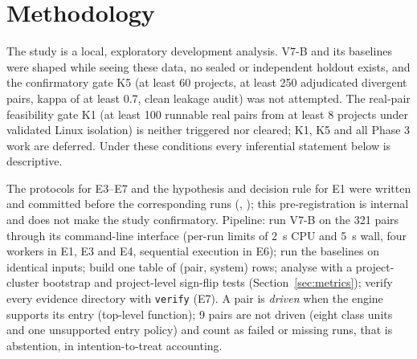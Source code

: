 \section{Methodology}\label{sec:method}
The study is a local, exploratory development analysis. V7-B and its baselines were shaped while seeing these data, no sealed or independent holdout exists, and the confirmatory gate K5 (at least 60 projects, at least 250 adjudicated divergent pairs, kappa of at least 0.7, clean leakage audit) was not attempted. The real-pair feasibility gate K1 (at least 100 runnable real pairs from at least 8 projects under validated Linux isolation) is neither triggered nor cleared; K1, K5 and all Phase 3 work are deferred. Under these conditions every inferential statement below is descriptive.

The protocols for E3--E7 and the hypothesis and decision rule for E1 were written and committed before the corresponding runs (, ); this pre-registration is internal and does not make the study confirmatory. Pipeline: run V7-B on the 321 pairs through its command-line interface (per-run limits of 2~s CPU and 5~s wall, four workers in E1, E3 and E4, sequential execution in E6); run the baselines on identical inputs; build one table of (pair, system) rows; analyse with a project-cluster bootstrap and project-level sign-flip tests (Section~\ref{sec:metrics}); verify every evidence directory with \texttt{verify} (E7). A pair is \emph{driven} when the engine supports its entry (top-level function); 9 pairs are not driven (eight class units and one unsupported entry policy) and count as failed or missing runs, that is abstention, in intention-to-treat accounting.
